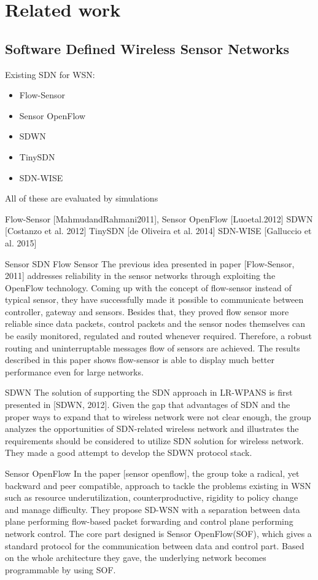 \section{Related work}

\subsection{Software Defined Wireless Sensor Networks}


Existing SDN for WSN:
\begin{itemize}
\item	Flow-Sensor
\item	Sensor OpenFlow
\item	SDWN
\item	TinySDN
\item	SDN-WISE
\end{itemize}
All of these are evaluated by simulations


Flow-Sensor [MahmudandRahmani2011], 
Sensor OpenFlow [Luoetal.2012] 
SDWN [Costanzo et al. 2012]
TinySDN [de Oliveira et al. 2014]
SDN-WISE [Galluccio et al. 2015]



Sensor SDN
Flow Sensor
The previous idea presented in paper [Flow-Sensor, 2011] addresses reliability in the sensor networks through exploiting the OpenFlow technology. Coming up with the concept of flow-sensor instead of typical sensor, they have successfully made it possible to communicate between controller, gateway and sensors. Besides that, they proved flow sensor more reliable since data packets, control packets and the sensor nodes themselves can be easily monitored, regulated and routed whenever required. Therefore, a robust routing and uninterruptable messages flow of sensors are achieved. The results described in this paper shows flow-sensor is able to display much better performance even for large networks.

SDWN
	The solution of supporting the SDN approach in LR-WPANS is first presented in [SDWN, 2012]. Given the gap that advantages of SDN and the proper ways to expand that to wireless network were not clear enough, the group analyzes the opportunities of SDN-related wireless network and illustrates the requirements should be considered to utilize SDN solution for wireless network. They made a good attempt to develop the SDWN protocol stack.

Sensor OpenFlow
	In the paper [sensor openflow], the group toke a radical, yet backward and peer compatible, approach to tackle the problems existing in WSN such as resource underutilization, counterproductive, rigidity to policy change and manage difficulty. They propose SD-WSN with a separation between data plane performing flow-based packet forwarding and control plane performing network control. The core part designed is Sensor OpenFlow(SOF), which gives a standard protocol for the communication between data and control part. Based on the whole architecture they gave, the underlying network becomes programmable by using SOF.

